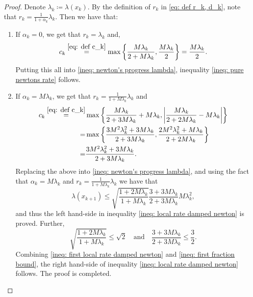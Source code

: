 \documentclass[sn-mathphys-num]{sn-jnl}%
\theoremstyle{thmstyleone}%
\theoremstyle{thmstyletwo}%
\theoremstyle{thmstylethree}%
\numberwithin{equation}{section}
\begin{document}
\begin{proof}
    Denote $\lambda_{k} \coloneq \lambda(x_{k})$.  By the definition of $r_k$ in \eqref{eq: def r_k, d_k}, note that $r_k = \frac{1}{1+\alpha_k} \lambda_k$. Then we have that:
    \begin{enumerate}
        \item If $\alpha_k = 0$, we get that $r_k = \lambda_k$ and,
        \begin{equation*}
            c_k \overset{\eqref{eq: def c_k}}{=} \max \left\lbrace \frac{M \lambda_k }{2 + M \lambda_k},  \frac{M\lambda_k}{2} \right\rbrace = \frac{M\lambda_k}{2}.
        \end{equation*}
        Putting this all into \eqref{ineq: newton's progress lambda}, inequality \eqref{ineq: pure newtons rate} follows. 
        \item If $\alpha_k = M \lambda_k$, we get that $r_k = \frac{1}{1+M \lambda_k} \lambda_k$ and
        \begin{align*}
            c_k  \overset{\eqref{eq: def c_k}}{=} & \max \left\lbrace \frac{M \lambda_k }{2 + 3M \lambda_k} + M \lambda_k,  \left|\frac{M \lambda_k }{2 + 2M \lambda_k} - M \lambda_k \right| \right\rbrace \\
               = & \max \left\lbrace \frac{3 M^2 \lambda_k^2 +3 M \lambda_k}{2 + 3 M \lambda_k}, \frac{2 M^2 \lambda_k^2 + M \lambda_k}{2 + 2 M \lambda_k} \right\rbrace \\
               = & \frac{3 M^2 \lambda_k^2 +3 M \lambda_k}{2 + 3 M \lambda_k}.
        \end{align*}
            Replacing the above into \eqref{ineq: newton's progress lambda}, and using the fact that $\alpha_k = M \lambda_k$ and $r_k = \frac{1}{1+M \lambda_k} \lambda_k$ we have that 
            \begin{equation} \label{ineq: first local rate damped newton}
                        \lambda(x_{k+1}) \leq \sqrt{\frac{1 + 2 M \lambda_k}{1 + M \lambda_k}} \frac{3+ 3 M \lambda_k }{2 + 3 M \lambda_k} M \lambda_k^2,
            \end{equation}
            and thus the left hand-side in inequality \eqref{ineq: local rate damped newton} is proved. Further, 
            \begin{equation} \label{ineq: first fraction bound}
                \sqrt{\frac{1 + 2 M \lambda_k}{1 + M \lambda_k}} \leq \sqrt{2} \quad \text{and} \quad \frac{3 + 3M \lambda_k}{2 + 3M \lambda_k} \leq \frac{3}{2}.
            \end{equation}
            Combining \eqref{ineq: first local rate damped newton} and \eqref{ineq: first fraction bound}, the right hand-side of inequality \eqref{ineq: local rate damped newton} follows. The proof is completed.
    \end{enumerate}
\end{proof}
\end{document}
